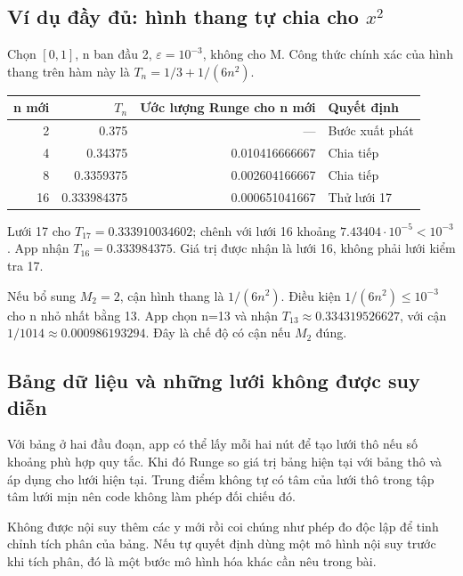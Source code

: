 \subsection{Ví dụ đầy đủ: hình thang tự chia cho $x^2$}
Chọn $[0,1]$, n ban đầu 2, $\varepsilon=10^{-3}$, không cho M. Công thức chính xác của hình thang trên hàm này là $T_n=1/3+1/(6n^2)$.
\begin{center}\begin{tabular}{rrrl}
\toprule n mới&$T_n$&Ước lượng Runge cho n mới&Quyết định\\\midrule
2&0.375&---&Bước xuất phát\\
4&0.34375&0.010416666667&Chia tiếp\\
8&0.3359375&0.002604166667&Chia tiếp\\
16&0.333984375&0.000651041667&Thử lưới 17\\\bottomrule
\end{tabular}\end{center}
Lưới 17 cho $T_{17}=0.333910034602$; chênh với lưới 16 khoảng $7.43404\cdot10^{-5}<10^{-3}$. App nhận $T_{16}=0.333984375$. Giá trị được nhận là lưới 16, không phải lưới kiểm tra 17.

Nếu bổ sung $M_2=2$, cận hình thang là $1/(6n^2)$. Điều kiện $1/(6n^2)\le10^{-3}$ cho n nhỏ nhất bằng 13. App chọn n=13 và nhận $T_{13}\approx0.334319526627$, với cận $1/1014\approx0.000986193294$. Đây là chế độ có cận nếu $M_2$ đúng.

\subsection{Bảng dữ liệu và những lưới không được suy diễn}
Với bảng ở hai đầu đoạn, app có thể lấy mỗi hai nút để tạo lưới thô nếu số khoảng phù hợp quy tắc. Khi đó Runge so giá trị bảng hiện tại với bảng thô và áp dụng cho lưới hiện tại. Trung điểm không tự có tâm của lưới thô trong tập tâm lưới mịn nên code không làm phép đối chiếu đó.

Không được nội suy thêm các y mới rồi coi chúng như phép đo độc lập để tinh chỉnh tích phân của bảng. Nếu tự quyết định dùng một mô hình nội suy trước khi tích phân, đó là một bước mô hình hóa khác cần nêu trong bài.

